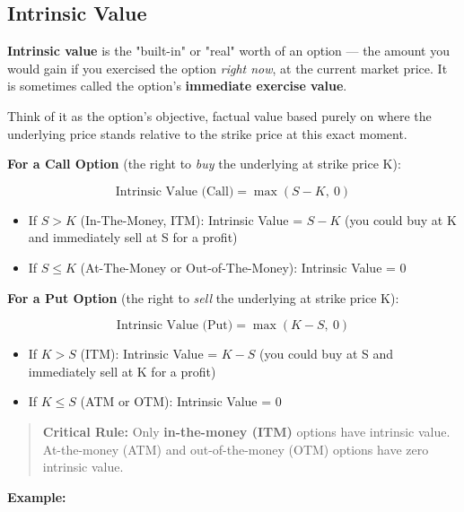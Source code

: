 \documentclass[12pt,openany]{book}
\theoremstyle{definition}
\theoremstyle{remark}
\begin{document}
\medskip
\subsection{Intrinsic Value}
\textbf{Intrinsic value} is the "built-in" or "real" worth of an option --- the amount you would gain if you exercised the option \emph{right now}, at the current market price. It is sometimes called the option's \textbf{immediate exercise value}.

Think of it as the option's objective, factual value based purely on where the underlying price stands relative to the strike price at this exact moment.

\textbf{For a Call Option} (the right to \emph{buy} the underlying at strike price K):

\[
\text{Intrinsic Value (Call)} = \max(S - K, \ 0)
\]

\begin{itemize}
\item If $S > K$ (In-The-Money, ITM): Intrinsic Value = $S - K$ (you could buy at K and immediately sell at S for a profit)


\item If $S \leq K$ (At-The-Money or Out-of-The-Money): Intrinsic Value = 0


\end{itemize}
\textbf{For a Put Option} (the right to \emph{sell} the underlying at strike price K):

\[
\text{Intrinsic Value (Put)} = \max(K - S, \ 0)
\]

\begin{itemize}
\item If $K > S$ (ITM): Intrinsic Value = $K - S$ (you could buy at S and immediately sell at K for a profit)


\item If $K \leq S$ (ATM or OTM): Intrinsic Value = 0


\end{itemize}
\begin{quote}
\textbf{Critical Rule:} Only \textbf{in-the-money (ITM)} options have intrinsic value. At-the-money (ATM) and out-of-the-money (OTM) options have zero intrinsic value.

\end{quote}
\textbf{Example:}
\end{document}
